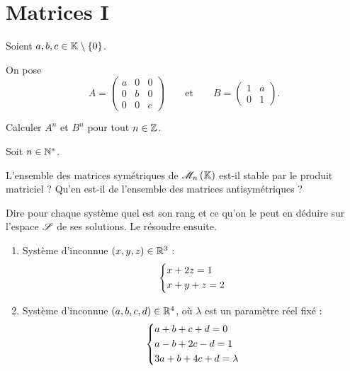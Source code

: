 \chapter{Matrices I}

\minitoc

\begin{exo}[Exercice 1]
Soient \(a,b,c\in\mathbb{K}\setminus\left\lbrace0\right\rbrace\).

On pose \[A=\begin{pmatrix}
a & 0 & 0 \\
0 & b & 0 \\
0 & 0 & c
\end{pmatrix}\qquad\text{et}\qquad B=\begin{pmatrix}
1 & a \\
0 & 1
\end{pmatrix}.\]

Calculer \(A^n\) et \(B^n\) pour tout \(n\in\mathbb{Z}\).
\end{exo}

\begin{corr}
\end{corr}

\begin{exo}[Exercice 2]
Soit \(n\in\mathbb{N}^*\).

L'ensemble des matrices symétriques de \(\M{n}\) est-il stable par le produit matriciel ? Qu'en est-il de l'ensemble des matrices antisymétriques ?
\end{exo}

\begin{corr}
\end{corr}

\begin{exo}[Exercice 3]
Dire pour chaque système quel est son rang et ce qu'on le peut en déduire sur l'espace \(\mathscr{S}\) de ses solutions. Le résoudre ensuite.

\begin{enumerate}
\item Système d'inconnue \(\left(x,y,z\right)\in\mathbb{R}^3\) : \[\begin{dcases}
x+2z=1 \\
x+y+z=2
\end{dcases}\]

\item Système d'inconnue \(\left(a,b,c,d\right)\in\mathbb{R}^4\), où \(\lambda\) est un paramètre réel fixé : \[\begin{dcases}
a+b+c+d=0 \\
a-b+2c-d=1 \\
3a+b+4c+d=\lambda
\end{dcases}\]
\end{enumerate}
\end{exo}

